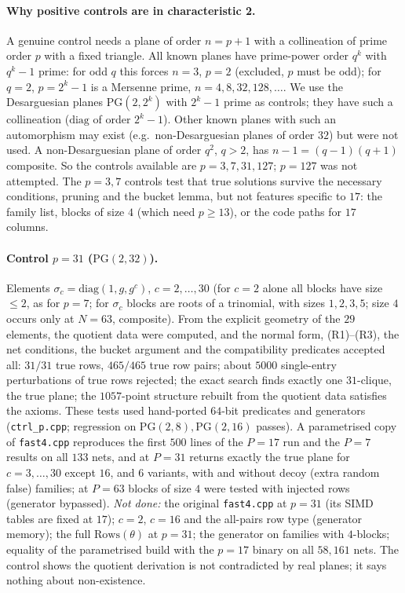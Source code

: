 \documentclass[11pt,a4paper]{article}
\theoremstyle{definition}
\newcommand{\Rows}{\mathrm{Rows}}
\begin{document}
\paragraph{Why positive controls are in characteristic 2.} A genuine control needs a plane of order $n=p+1$ with a collineation of prime order $p$ with a fixed triangle. All known planes have prime-power order $q^k$ with $q^k-1$ prime: for odd $q$ this forces $n=3$, $p=2$ (excluded, $p$ must be odd); for $q=2$, $p=2^k-1$ is a Mersenne prime, $n=4,8,32,128,\dots$. We use the Desarguesian planes $\mathrm{PG}(2,2^k)$ with $2^k-1$ prime as controls; they have such a collineation ($\mathrm{diag}$ of order $2^k-1$). Other known planes with such an automorphism may exist (e.g.\ non-Desarguesian planes of order $32$) but were not used. A non-Desarguesian plane of order $q^2$, $q>2$, has $n-1=(q-1)(q+1)$ composite. So the controls available are $p=3,7,31,127$; $p=127$ was not attempted. The $p=3,7$ controls test that true solutions survive the necessary conditions, pruning and the bucket lemma, but not features specific to $17$: the family list, blocks of size $4$ (which need $p\ge13$), or the code paths for $17$ columns.

\paragraph{Control $p=31$ ($\mathrm{PG}(2,32)$).} Elements $\sigma_c=\mathrm{diag}(1,g,g^c)$, $c=2,\dots,30$ (for $c=2$ alone all blocks have size $\le2$, as for $p=7$; for $\sigma_c$ blocks are roots of a trinomial, with sizes $1,2,3,5$; size $4$ occurs only at $N=63$, composite). From the explicit geometry of the $29$ elements, the quotient data were computed, and the normal form, (R1)--(R3), the net conditions, the bucket argument and the compatibility predicates accepted all: $31/31$ true rows, $465/465$ true row pairs; about $5000$ single-entry perturbations of true rows rejected; the exact search finds exactly one $31$-clique, the true plane; the $1057$-point structure rebuilt from the quotient data satisfies the axioms. These tests used hand-ported $64$-bit predicates and generators (\texttt{ctrl\_p.cpp}; regression on $\mathrm{PG}(2,8),\mathrm{PG}(2,16)$ passes). A parametrised copy of \texttt{fast4.cpp} reproduces the first $500$ lines of the $P=17$ run and the $P=7$ results on all $133$ nets, and at $P=31$ returns exactly the true plane for $c=3,\dots,30$ except $16$, and $6$ variants, with and without decoy (extra random false) families; at $P=63$ blocks of size $4$ were tested with injected rows (generator bypassed).
\emph{Not done:} the original \texttt{fast4.cpp} at $p=31$ (its SIMD tables are fixed at $17$); $c=2$, $c=16$ and the all-pairs row type (generator memory); the full $\Rows(\theta)$ at $p=31$; the generator on families with $4$-blocks; equality of the parametrised build with the $p=17$ binary on all $58{,}161$ nets. The control shows the quotient derivation is not contradicted by real planes; it says nothing about non-existence.
\end{document}
